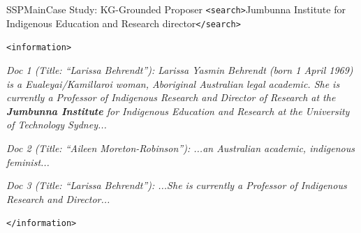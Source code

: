 \begin{casepagebox}{SSPMain}{Case Study: KG-Grounded Proposer}
\textcolor{TagSearch}{\texttt{<search>}}Jumbunna Institute for Indigenous Education and Research director\textcolor{TagSearch}{\texttt{</search>}}

\textcolor{TagInfo}{\texttt{<information>}}

\textit{Doc 1 (Title: ``Larissa Behrendt''): Larissa Yasmin Behrendt (born 1 April 1969) is a Eualeyai/Kamillaroi woman, Aboriginal Australian legal academic. She is currently a Professor of Indigenous Research and Director of Research at the \colorbox{yellow!30}{\textbf{Jumbunna Institute}} for Indigenous Education and Research at the University of Technology Sydney...}

\textit{Doc 2 (Title: ``Aileen Moreton-Robinson''): ...an Australian academic, indigenous feminist...}

\textit{Doc 3 (Title: ``Larissa Behrendt''): ...She is currently a Professor of Indigenous Research and Director...}

\textcolor{TagInfo}{\texttt{</information>}}
\vspace{3mm}
\end{casepagebox}

